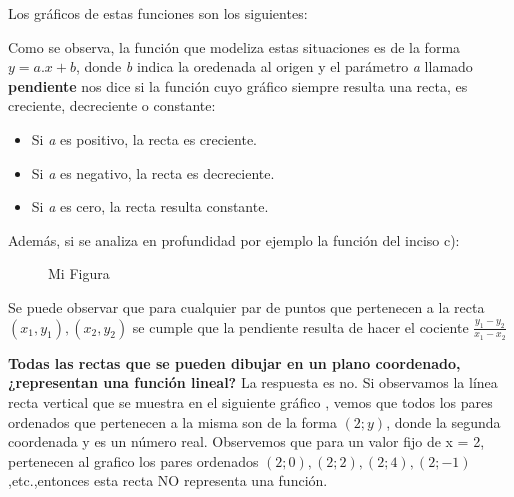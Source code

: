\documentclass[a4paper,10pt,BCOR10mm,oneside,headsepline]{scrbook}
\begin{document}
Los gráficos de estas funciones son los siguientes:


\begin{figure}[!h]
	\begin{center}
	\end{center}
\end{figure}

Como se observa, la función que modeliza estas situaciones es de la forma $y=a.x+b$, donde \textit{b} indica la oredenada al origen y el parámetro \textit{a} llamado \textbf{pendiente} nos dice si la función cuyo gráfico siempre resulta una recta, es creciente, decreciente o constante: 
\begin{itemize}
	\item Si \textit{a} es positivo, la recta es creciente.
	\item Si \textit{a} es negativo, la recta es decreciente.
	\item Si \textit{a} es cero, la recta resulta constante.
\end{itemize}

Además, si se analiza en profundidad por ejemplo la función del inciso c):

\begin{figure}[h!]
\centering
  \caption{Mi Figura}
  
\end{figure}



Se puede observar que para cualquier par de puntos que pertenecen a la recta $(x_1,y_1), (x_2,y_2)$ se cumple que la pendiente resulta de hacer el cociente $\frac{y_1-y_2}{x_1-x_2}$\\

\vspace{3cm}

\textbf{Todas las rectas que se pueden dibujar en un plano coordenado,¿representan una función lineal?}
La respuesta es no. Si observamos la línea recta vertical que se muestra en el siguiente gráfico , vemos que todos los
pares ordenados que pertenecen a la misma son de la
forma $(2;y)$, donde la segunda coordenada y es un número real.
Observemos que para un valor fijo de x = 2, pertenecen al grafico los pares ordenados $(2;0),(2;2),(2;4),(2;-1)$ ,etc.,entonces esta recta NO representa una función.
\end{document}
